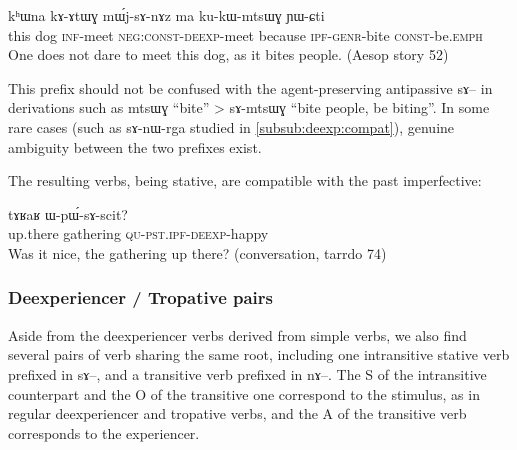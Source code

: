 \documentclass[oldfontcommands,oneside,a4paper,11pt]{memoir}
\newcommand{\ipa}[1]{{\phon #1}} %
\newcommand{\const}{\textsc{const}}
\newcommand{\deexp}{\textsc{deexp}}
\newcommand{\genr}{\textsc{genr}}
\newcommand{\ipf}{\textsc{ipf}}
\newcommand{\pst}{\textsc{pst}}
\newcommand{\qu}{\textsc{qu}}
\begin{document}
\begin{exe}
\ex
\gll \ipa{ki}   	\ipa{kʰɯna}   	\ipa{kɤ-ɤtɯɣ}   	\ipa{mɯ́j-sɤ-nɤz}   	\ipa{ma}   	\ipa{ku-kɯ-mtsɯɣ}   	\ipa{ɲɯ-ɕti}    \\
this dog  \textsc{inf}-meet \textsc{neg:const}-\deexp{}-meet because \ipf{}-\genr{}-bite \const{}-be\textsc{.emph} \\
\glt One does not dare to meet this dog, as it bites people. (Aesop story 52)
\end{exe}  

This prefix should not be confused with the  agent-preserving antipassive \ipa{sɤ}-- in derivations such as \ipa{mtsɯɣ} ``bite'' > \ipa{sɤ-mtsɯɣ} ``bite people, be biting''. In some rare cases (such as \ipa{sɤ-nɯ-rga} studied in \ref{subsub:deexp:compat}), genuine ambiguity between the two prefixes exist. 

The resulting verbs, being stative, are compatible with the past imperfective:
\begin{exe}
\ex
\gll    \ipa{atu} 	\ipa{tɤʁaʁ} 	\ipa{ɯ-pɯ́-sɤ-scit?}   \\
up.there  gathering \qu{}-\pst{}.\ipf{}-\deexp{}-happy        \\
 \glt Was it nice, the gathering up there?    (conversation, tarrdo 74)
\end{exe}  


\subsubsection{Deexperiencer / Tropative pairs} \label{subsub:deexp.pairs}
Aside from the deexperiencer verbs derived from simple verbs, we also find several pairs of verb sharing the same root,  including one intransitive stative verb prefixed in \ipa{sɤ}--, and a transitive verb prefixed in \ipa{nɤ}--. The S of the intransitive counterpart and the O of the transitive one correspond  to the stimulus, as in regular deexperiencer and tropative verbs, and the A of the transitive verb corresponds to the experiencer.
\end{document}
